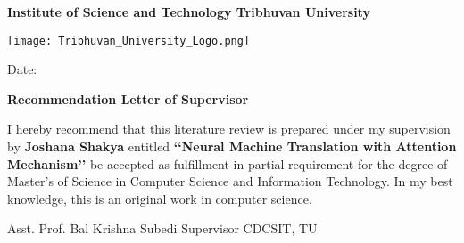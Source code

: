 \begin{center}
\textbf{
\large
Institute of Science and Technology
\linebreak
Tribhuvan University
}
\end{center}

\vspace{2cm}

\begin{center}
\texttt{[image: Tribhuvan\_University\_Logo.png]}
\end{center}

\begin{flushright}
Date: \dottedline{4cm}
\end{flushright}

\vspace{2cm}

\begin{center}
\textbf{Recommendation Letter of Supervisor}
\end{center}

\vspace{1cm}

I hereby recommend that this literature review is prepared under my supervision by \textbf{Joshana Shakya} entitled \textbf{\lq\lq Neural Machine Translation with Attention Mechanism\rq\rq} be accepted as fulfillment in partial requirement for the degree of Master's of Science in Computer Science and Information Technology. In my best knowledge, this is an original work in computer science.

\vspace{3cm}

\begin{flushleft}
\dottedline{5.8cm} \newline
Asst. Prof. Bal Krishna Subedi \newline
Supervisor \newline
CDCSIT, TU \newline
\end{flushleft}

\clearpage